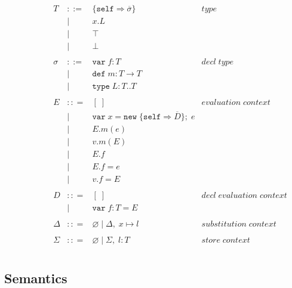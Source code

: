 \documentclass{llncs}
\begin{document}
\[\begin{array}{lll}
\begin{array}{lllr}
\end{array}
& ~~~~~~
&
\begin{array}{lllr}
T & ::= & \{\texttt{self} \Rightarrow \overline{\sigma}\} & type \\
& | & x.L &\\
& | & \top & \\
& | & \bot & \\
&&\\
\sigma & ::= & \texttt{var} \; f:T & decl \; type\\
       & |   & \texttt{def} \; m:T \rightarrow T \\
		 & |   & \texttt{type} \; L : T .. T &\\
&&\\
E & :: = & [\;] & evaluation \; context \\
       & | & \texttt{var} \; x = \texttt{new} \; \{\texttt{self} \Rightarrow \overline{D}\}; \; e& \\
       & | & E.m(e)\\
       & | & v.m(E)\\
       & | & E.f\\
       & | & E.f = e\\
       & | & v.f = E\\
&&\\
D & :: = & [\;] & decl \; evaluation \; context \\
       & | & \texttt{var} \; f : T = E\\
&&\\
\Delta & :: = & \varnothing \; | \; \Delta,\; x \mapsto l & substitution \; context \\
&&\\
\Sigma & :: = & \varnothing \; | \; \Sigma,\; l : T & store \; context \\
\end{array}
\end{array}
\]

\subsection{Semantics}




\end{document}
